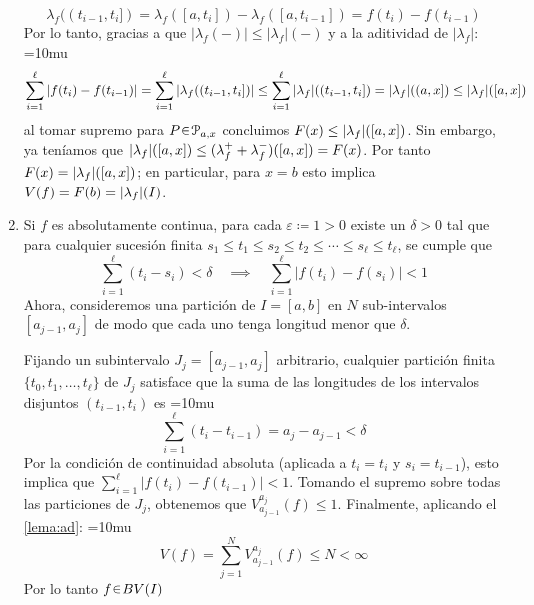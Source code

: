 \begin{sol}
\begin{enumerate}[label=(\roman*),leftmargin=1.8em]
\[
\lambda_f((t_{i-1},t_i]) = \lambda_f([a,t_i]) - \lambda_f([a,t_{i-1}]) = f(t_i) - f(t_{i-1})
\]
Por lo tanto, gracias a que $|\lambda_f(-)| \le |\lambda_f|(-)$ y a la aditividad de $|\lambda_f|$:
{\thickmuskip=10mu
\[
\sum^\ell_{i=1}\abs{f(t_i) - f(t_{i-1})} 
= \sum^\ell_{i=1}\abs{\lambda_f((t_{i-1},t_i])}
\le \sum^\ell_{i=1}\abs{\lambda_f}((t_{i-1},t_i])
=\abs{\lambda_f}((a,x])
\le \abs{\lambda_f}([a,x])
\]
}%
al tomar supremo para $P\en\mathcal{P}_{a,x}$ concluimos $F(x) \le \abs{\lambda_f}([a,x])$. Sin embargo, ya teníamos que $\abs{\lambda_f}([a,x]) \leq (\lambda^+_f + \lambda^-_f)([a,x]) = F(x)$. Por tanto $F(x) = \abs{\lambda_f}([a,x])$; en particular, para $x=b$ esto implica $V(f) = F(b) = \abs{\lambda_f}(I)$. 
\item %
Si $f$ es absolutamente continua, para cada $\varepsilon \coloneq1 >0$ existe un $\delta > 0$ tal que para cualquier sucesión finita $s_1\le t_1\le s_2\le t_2\leq \cdots \leq s_\ell \leq t_\ell$, se cumple que
\[
\sum_{i=1}^\ell (t_i - s_i) < \delta 
\quad\implies\quad 
\sum_{i=1}^\ell |f(t_i) - f(s_i)| < 1
\]
Ahora, consideremos una partición de $I = [a, b]$ en $N$ sub-intervalos $[a_{j-1}, a_j]$ de modo que cada uno tenga longitud menor que $\delta$.\par
Fijando un subintervalo $J_j = [a_{j-1}, a_j]$ arbitrario, cualquier partición finita $\{t_0, t_1, \dots, t_\ell\}$ de $J_j$ satisface que la suma de las longitudes de los intervalos disjuntos $(t_{i-1}, t_i)$ es
{\thickmuskip=10mu
\[
\sum_{i=1}^\ell (t_i - t_{i-1}) = a_j - a_{j-1}  < \delta
\]
}%
Por la condición de continuidad absoluta (aplicada a $t_i = t_i$ y $s_i = t_{i-1}$), esto implica que $\sum_{i=1}^\ell |f(t_i) - f(t_{i-1})| < 1$. Tomando el supremo sobre todas las particiones de $J_j$, obtenemos que $V_{a_{j-1}}^{a_j}(f) \le 1$.
Finalmente, aplicando el \cref{lema:ad}: 
{\thickmuskip=10mu
\[
V(f) = \sum^N_{j=1} V_{a_{j-1}}^{a_j}(f)  \leq N < \infty
\]
}%
Por lo tanto $f\en BV(I)$
\end{enumerate}
\end{sol}

